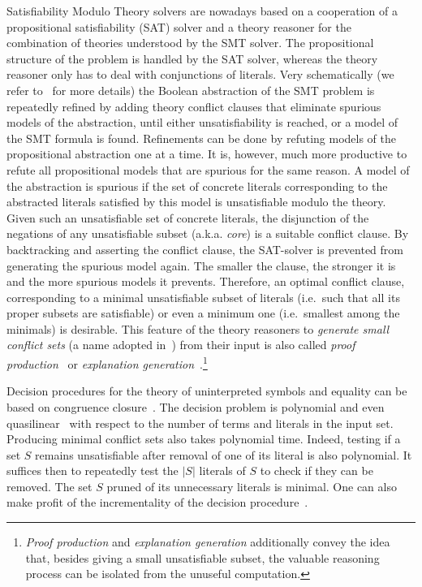 \documentclass{easychair}
\begin{document}
Satisfiability Modulo Theory solvers are nowadays based on a cooperation of a
propositional satisfiability (SAT) solver and a theory reasoner for the
combination of theories understood by the SMT solver. The propositional
structure of the problem is handled by the SAT solver, whereas the theory
reasoner only has to deal with conjunctions of literals.  Very schematically (we
refer to~\cite{Barrett14} for more details) the Boolean abstraction of the SMT
problem is repeatedly refined by adding theory conflict clauses that eliminate
spurious models of the abstraction, until either unsatisfiability is reached, or
a model of the SMT formula is found.  Refinements can be done by refuting models
of the propositional abstraction one at a time.  It is, however, much more
productive to refute all propositional models that are spurious for the same
reason.  A model of the abstraction is spurious if the set of concrete literals
corresponding to the abstracted literals satisfied by this model is
unsatisfiable modulo the theory.  Given such an unsatisfiable set of concrete literals, the
disjunction of the negations of any unsatisfiable subset (a.k.a. \emph{core}) is a suitable
conflict clause.  By backtracking and asserting the conflict clause, the
SAT-solver is prevented from generating the spurious model again. The smaller
the clause, the stronger it is and the more spurious models it prevents.
Therefore, an optimal conflict clause, corresponding to a minimal unsatisfiable
subset of literals (i.e.\ such that all its proper subsets are satisfiable) or
even a minimum one (i.e.\ smallest among the minimals) is desirable.  This
feature of the theory reasoners to \emph{generate small conflict sets} (a name
adopted in~\cite{Barrett14}) from their input is also called \emph{proof
production}~\cite{Nieuwenhuis3,Nieuwenhuis9} or \emph{explanation
generation}~\cite{Nieuwenhuis6}.\footnote{\emph{Proof production} and \emph{explanation
  generation} additionally convey the idea that, besides giving a small
  unsatisfiable subset, the valuable reasoning process can be isolated from the
  unuseful computation.}

Decision procedures for the theory of uninterpreted symbols and equality can be
based on congruence closure~\cite{Nelson2,Downey1,Nieuwenhuis6}.  The decision problem is polynomial
and even quasilinear~\cite{Downey1} with respect to the number of terms and
literals in the input set.  Producing minimal conflict sets also takes
polynomial time.  Indeed, testing if a set $S$ remains unsatisfiable after
removal of one of its literal is also polynomial.  It suffices then to
repeatedly test the $|S|$ literals of $S$ to check if they can be removed.  The
set $S$ pruned of its unnecessary literals is minimal.  One can also make profit of the incrementality of the decision procedure~\cite{Fontaine1}.
\end{document}

